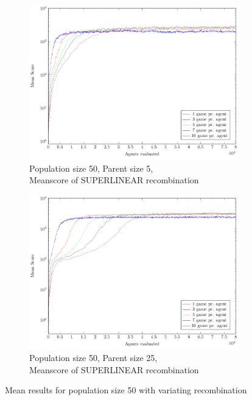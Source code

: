 \begin{figure}
\begin{subfigure}[b]{0.45\textwidth}
    \end{subfigure}
    \begin{subfigure}[b]{0.45\textwidth}
    	\centering
    	\caption{Population size 50, Parent size 5, \\ Meanscore of SUPERLINEAR recombination}
        \includegraphics[width=\textwidth]{data/cma_population_offspring/50x_split/superlinear_l50_o5/mean/PlotFile.pdf}
    \end{subfigure}
    \begin{subfigure}[b]{0.45\textwidth}
    	\centering
    	\caption{Population size 50, Parent size 25, \\ Meanscore of SUPERLINEAR recombination}
        \includegraphics[width=\textwidth]{data/cma_population_offspring/50x_split/superlinear_l50_o25/mean/PlotFile.pdf}
    \end{subfigure}
    
    \caption{Mean results for population size 50 with variating recombination}
\end{figure}


